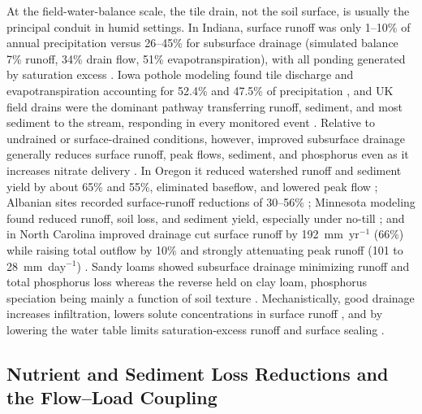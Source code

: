 At the field-water-balance scale, the tile drain, not the soil surface, is
usually the principal conduit in humid settings. In Indiana, surface runoff was
only 1--10\% of annual precipitation versus 26--45\% for subsurface drainage
(simulated balance 7\% runoff, 34\% drain flow, 51\% evapotranspiration), with
all ponding generated by saturation excess \parencite{Saadat2020}. Iowa pothole
modeling found tile discharge and evapotranspiration accounting for 52.4\% and
47.5\% of precipitation \parencite{Amado2018,Martin2019}, and UK field drains
were the dominant pathway transferring runoff, sediment, and most sediment to
the stream, responding in every monitored event \parencite{Deasy2009}. Relative
to undrained or surface-drained conditions, however, improved subsurface
drainage generally reduces surface runoff, peak flows, sediment, and phosphorus
even as it increases nitrate delivery
\parencite{FAUSEY1995,SKAGGS1994,THOMAS1995,Gramlich2018}. In Oregon it reduced
watershed runoff and sediment yield by about 65\% and 55\%, eliminated baseflow,
and lowered peak flow \parencite{ISTOK1983}; Albanian sites recorded
surface-runoff reductions of 30--56\% \parencite{Grazhdani1996}; Minnesota
modeling found reduced runoff, soil loss, and sediment yield, especially under
no-till \parencite{Maalim2013}; and in North Carolina improved drainage cut
surface runoff by 192~mm~yr$^{-1}$ (66\%) while raising total outflow by 10\% and
strongly attenuating peak runoff (101 to 28~mm~day$^{-1}$)
\parencite{KONYHA1992}. Sandy loams showed subsurface drainage minimizing runoff
and total phosphorus loss whereas the reverse held on clay loam, phosphorus
speciation being mainly a function of soil texture \parencite{Eastman2010}.
Mechanistically, good drainage increases infiltration, lowers solute
concentrations in surface runoff \parencite{Tong2016,Tao2017}, and by lowering
the water table limits saturation-excess runoff and surface sealing
\parencite{Augeard2005}.

\subsection{Nutrient and Sediment Loss Reductions and the Flow--Load Coupling}

